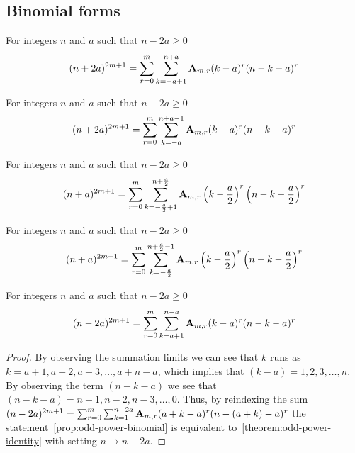 \subsection{Binomial forms}\label{subsec:binomial-forms}

\begin{corollary}
    \label{prop:binomial-form}
    For integers $n$ and $a$ such that $n-2a \geq 0$
    \begin{align*}
    (n+2a)^{2m+1} = \sum_{r=0}^{m} \sum_{k=-a+1}^{n+a} {\mathbf{A}} \sb{m,r} (k-a)^r (n-k-a)^r
    \end{align*}
\end{corollary}

\begin{corollary}
    \label{prop:shifted-binomial-form}
    For integers $n$ and $a$ such that $n-2a \geq 0$
    \begin{align*}
    (n+2a)^{2m+1} = \sum_{r=0}^{m} \sum_{k=-a}^{n+a-1} {\mathbf{A}} \sb{m,r} (k-a)^r (n-k-a)^r
    \end{align*}
\end{corollary}

\begin{corollary}
    \label{cor:centered-binomial-form}
    For integers $n$ and $a$ such that $n-2a \geq 0$
    \begin{align*}
    (n+a)^{2m+1} = \sum_{r=0}^{m} \sum_{k=-\frac{a}{2}+1}^{n+\frac{a}{2}} {\mathbf{A}} \sb{m,r} \left( k-\frac{a}{2} \right)^r \left( n-k-\frac{a}{2} \right)^r
    \end{align*}
\end{corollary}

\begin{corollary}
    \label{cor:shifted-centered-binomial-form}
    For integers $n$ and $a$ such that $n-2a \geq 0$
    \begin{align*}
    (n+a)^{2m+1} = \sum_{r=0}^{m} \sum_{k=-\frac{a}{2}}^{n+\frac{a}{2}-1} {\mathbf{A}} \sb{m,r} \left( k-\frac{a}{2} \right)^r \left( n-k-\frac{a}{2} \right)^r
    \end{align*}
\end{corollary}

\begin{proposition}
    \label{prop:negated-binomial-form}
    For integers $n$ and $a$ such that $n-2a \geq 0$
    \begin{align*}
    (n-2a)^{2m+1} = \sum_{r=0}^{m} \sum_{k=a+1}^{n-a} {\mathbf{A}} \sb{m,r} (k-a)^r (n-k-a)^r
    \end{align*}
    \begin{proof}
        By observing the summation limits we can see that $k$ runs as $k=a+1,a+2,a+3,\ldots,a+n-a$, which
        implies that $(k-a)=1,2,3,\ldots, n$.
        By observing the term $(n-k-a)$ we see that $(n-k-a)=n-1,n-2,n-3,\ldots,0$.
        Thus, by reindexing the sum
        $(n-2a)^{2m+1} = \sum_{r=0}^{m} \sum_{k=1}^{n-2a} {\mathbf{A}} \sb{m,r} (a+k-a)^r (n-(a+k)-a)^r$
        the statement~\eqref{prop:odd-power-binomial} is equivalent to~\eqref{theorem:odd-power-identity}
        with setting $n \rightarrow n-2a$.
    \end{proof}
\end{proposition}

